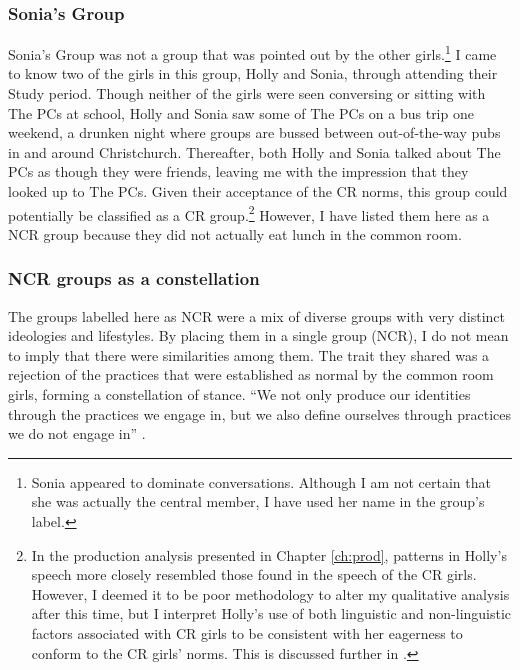 

\subsubsection{Sonia's Group}

Sonia's Group was not a group that was pointed out by the other girls.\footnote{Sonia appeared to dominate conversations. Although I am not certain that she was actually the central member, I have used her name in the group's label.}  I came to know two of the girls in this group, Holly and Sonia, through attending their Study period. Though neither of the girls were seen conversing or sitting with The PCs at school, Holly and Sonia saw some of The PCs on a bus trip one weekend, a drunken night where groups are bussed between out-of-the-way pubs in and around Christchurch. Thereafter, both Holly and Sonia talked about The PCs as though they were friends, leaving me with the impression that they looked up to The PCs. Given their acceptance of the CR norms, this group could potentially be classified as a CR group.\footnote{In the production analysis presented in Chapter \ref{ch:prod}, patterns in Holly's speech more closely resembled those found in the speech of the CR girls. However, I deemed it to be poor methodology to alter my qualitative analysis after this time,  but I interpret Holly's use of both linguistic and non-linguistic factors associated with CR girls to be consistent with her eagerness to conform to the CR girls' norms. This is discussed further in .}  However, I have listed them here as a NCR group because they did not actually eat lunch in the common room.

\subsubsection{NCR groups as a constellation}

The groups labelled here as NCR were a mix of diverse groups with very distinct ideologies and lifestyles. By placing them in a single group (NCR), I do not mean to imply that there were similarities among them. The trait they shared was a rejection of the practices that were established as normal by the common room girls, forming a constellation of stance.	``We not only produce our identities through the practices we engage in, but we also define ourselves through practices we do not engage in'' \citep[164]{wenger1998}.

